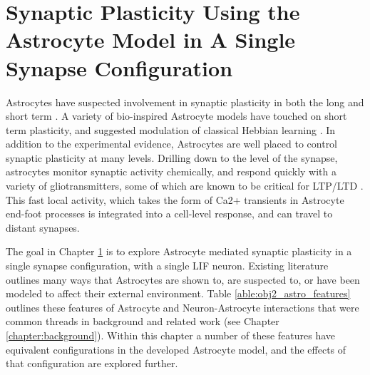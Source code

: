 \chapter{Synaptic Plasticity Using the Astrocyte Model in A Single Synapse
  Configuration} \label{chapter:obj2}

Astrocytes have suspected involvement in synaptic plasticity in both the
long \cite{min_2012} and short term \cite{pitta_2012}. A variety of
bio-inspired Astrocyte models have touched on short term plasticity, and
suggested modulation of classical Hebbian learning \cite{pitta_2016}. In
addition to the experimental evidence, Astrocytes are well placed to control
synaptic plasticity at many levels. Drilling down to the level of the
synapse, astrocytes monitor synaptic activity chemically, and respond
quickly with a variety of gliotransmitters, some of which are known to be
critical for LTP/LTD \cite{min_2012}. This fast local activity, which takes
the form of Ca2+ transients in Astrocyte end-foot processes is integrated
into a cell-level response, and can travel to distant synapses.

The goal in Chapter \ref{chapter:obj2} is to explore Astrocyte mediated synaptic
plasticity in a single synapse configuration, with a single LIF neuron. Existing
literature outlines many ways that Astrocytes are shown to, are suspected to, or
have been modeled to affect their external environment. Table
\ref{able:obj2_astro_features} outlines these features of Astrocyte and
Neuron-Astrocyte interactions that were common threads in background and related 
work (see Chapter \ref{chapter:background}). Within this chapter a number of
these features have equivalent configurations in the developed Astrocyte model,
and the effects of that configuration are explored further.

